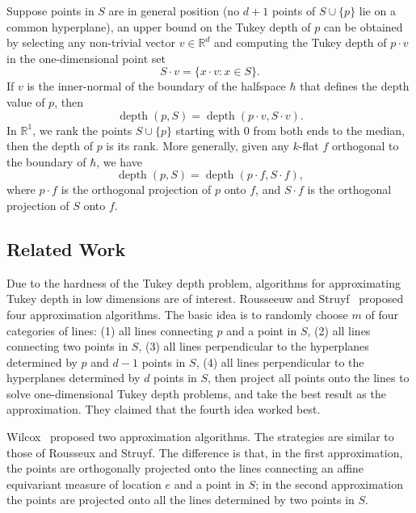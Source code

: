 \documentclass[preprint, 12pt]{elsarticle}
\DeclareMathOperator{\depth}{depth}
\begin{document}
Suppose points in $S$ are in general position (no $d + 1$ points of $S \cup \{ p \}$ lie on a common hyperplane), an upper bound on the Tukey depth of $p$ can be obtained by selecting any non-trivial vector $v \in \mathbb{R}^{d}$ and computing the Tukey depth of $p \cdot v$ in the one-dimensional point set
\begin{equation}
  \label{eq:intro.1dset}
  S \cdot v = \{x \cdot v : x \in S \}. \tag{$\ast$}
\end{equation}
If $v$ is the inner-normal of the boundary of the halfspace $\hbar$ that defines the depth value of $p$, then
\begin{equation}
  \label{eq:intro.def1}
  \depth{(p, S)} = \depth{(p \cdot v, S \cdot v)}.
\end{equation}
In $\mathbb{R}^{1}$, we rank the points $S \cup \{ p \}$ starting with $0$ from both ends to the median, then the depth of $p$ is its rank. More generally, given any $k$-flat $f$ orthogonal to the boundary of $\hbar$, we have
\begin{equation}
  \label{eq:intro.defi}
  \depth{(p, S)} = \depth{(p \cdot f, S \cdot f)},
\end{equation}
where $p \cdot f$ is the orthogonal projection of $p$ onto $f$, and $S \cdot f$ is the orthogonal projection of $S$ onto $f$.

\subsection{Related Work}
Due to the hardness of the Tukey depth problem, algorithms for approximating Tukey depth in low dimensions are of interest.
Rousseeuw and Struyf~\cite{Rousseeuw98} proposed four approximation algorithms. The basic idea is to randomly choose $m$ of four categories of lines: (1) all lines connecting $p$ and a point in $S$, (2) all lines connecting two points in $S$, (3) all lines perpendicular to the hyperplanes determined by $p$ and $d-1$ points in $S$, (4) all lines perpendicular to the hyperplanes determined by $d$ points in $S$, then project all points onto the lines to solve one-dimensional Tukey depth problems, and take the best result as the approximation. They claimed that the fourth idea worked best.

Wilcox~\cite{Wilcox03} proposed two approximation algorithms. The strategies are similar to those of Rousseux and Struyf. The difference is that, in the first approximation, the points are orthogonally projected onto the lines connecting an affine equivariant measure of location $e$ and a point in $S$; in the second approximation the points are projected onto all the lines determined by two points in $S$.
\end{document}
